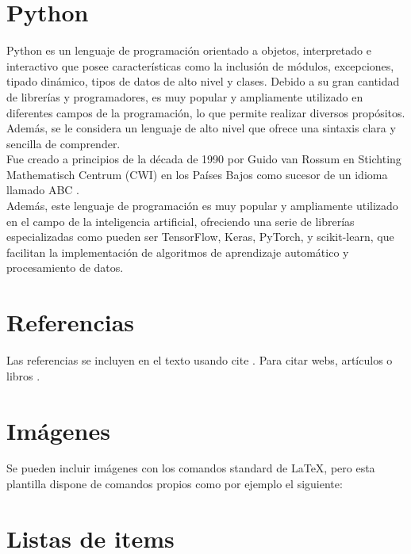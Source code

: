 \section{Python}

Python \cite{python} es un lenguaje de programación orientado a objetos, interpretado e interactivo que posee características como la inclusión de módulos, excepciones, tipado dinámico, tipos de datos de alto nivel y clases. Debido a su gran cantidad de librerías y programadores, es muy popular y ampliamente utilizado en diferentes campos de la programación, lo que permite realizar diversos propósitos. Además, se le considera un lenguaje de alto nivel que ofrece una sintaxis clara y sencilla de comprender. \\
Fue creado a principios de la década de 1990 por Guido van Rossum en Stichting Mathematisch Centrum (CWI) en los Países Bajos como sucesor de un idioma llamado ABC \cite{pythonhistory}. \\
Además, este lenguaje de programación es muy popular y ampliamente utilizado en el campo de la inteligencia artificial, ofreciendo una serie de librerías especializadas como pueden ser TensorFlow, Keras, PyTorch, y scikit-learn, que facilitan la implementación de algoritmos de aprendizaje automático y procesamiento de datos. \\
\section{Referencias}

Las referencias se incluyen en el texto usando cite \cite{wiki:latex}. Para citar webs, artículos o libros \cite{wiki:latex}.


\section{Imágenes}

Se pueden incluir imágenes con los comandos standard de \LaTeX, pero esta plantilla dispone de comandos propios como por ejemplo el siguiente:




\section{Listas de items}

